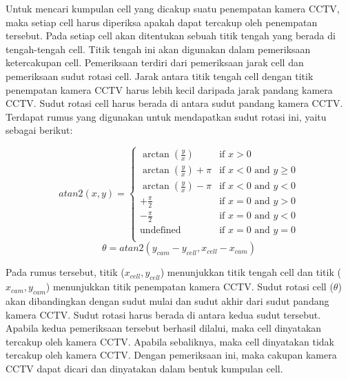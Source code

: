 Untuk mencari kumpulan cell yang dicakup suatu penempatan kamera CCTV, maka setiap cell harus diperiksa apakah dapat tercakup oleh penempatan tersebut. Pada setiap cell akan ditentukan sebuah titik tengah yang berada di tengah-tengah cell. Titik tengah ini akan digunakan dalam pemeriksaan ketercakupan cell. Pemeriksaan terdiri dari pemeriksaan jarak cell dan pemeriksaan sudut rotasi cell. Jarak antara titik tengah cell dengan titik penempatan kamera CCTV harus lebih kecil daripada jarak pandang kamera CCTV. Sudut rotasi cell harus berada di antara sudut pandang kamera CCTV. Terdapat rumus yang digunakan untuk mendapatkan sudut rotasi ini, yaitu sebagai berikut:

\begin{equation*}
	atan2(x,y) =
	\left \{
  		\begin{array}{ll}
  			\arctan(\frac{y}{x}) & \text{if } x>0\\
  			\arctan(\frac{y}{x})+\pi & \text{if } x<0 \text{ and } y\geq0\\
			\arctan(\frac{y}{x})-\pi & \text{if } x<0 \text{ and } y<0\\
			+\frac{\pi}{2} & \text{if } x=0 \text{ and } y>0\\
			-\frac{\pi}{2} & \text{if } x=0 \text{ and } y<0\\
			\text{undefined} & \text{if } x=0 \text{ and } y=0\\
  		\end{array}
  	\right.
\end{equation*}
\begin{equation*}
	\theta = atan2(y_{cam} - y_{cell}, x_{cell} - x_{cam})
\end{equation*}

Pada rumus tersebut, titik (\(x_{cell},y_{cell}\)) menunjukkan titik tengah cell dan titik (\(x_{cam},y_{cam}\)) menunjukkan titik penempatan kamera CCTV. Sudut rotasi cell (\(\theta\)) akan dibandingkan dengan sudut mulai dan sudut akhir dari sudut pandang kamera CCTV. Sudut rotasi harus berada di antara kedua sudut tersebut. Apabila kedua pemeriksaan tersebut berhasil dilalui, maka cell dinyatakan tercakup oleh kamera CCTV. Apabila sebaliknya, maka cell dinyatakan tidak tercakup oleh kamera CCTV. Dengan pemeriksaan ini, maka cakupan kamera CCTV dapat dicari dan dinyatakan dalam bentuk kumpulan cell.

